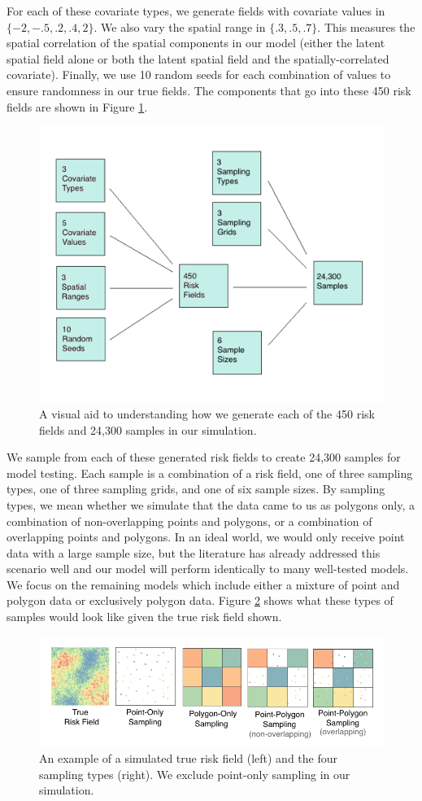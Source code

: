 \documentclass{article}
\begin{document}
For each of these covariate types, we generate fields with covariate values in $\{-2, -.5, .2, .4, 2\}$. We also vary the spatial range in $\{.3, .5, .7\}$. This measures the spatial correlation of the spatial components in our model (either the latent spatial field alone or both the latent spatial field and the spatially-correlated  covariate). Finally, we use 10 random seeds for each combination of values to ensure randomness in our true fields. The components that go into these 450 risk fields are shown in Figure \ref{fig:parPlot}.

 \begin{figure}[ht]
    \centering
    \includegraphics[width=.7\textwidth]{./figures/samplingexplained.png}
    \caption{A visual aid to understanding how we generate each of the 450 risk fields and 24,300 samples in our simulation.}
    \label{fig:parPlot}
\end{figure}

We sample from each of these generated risk fields to create 24,300 samples for model testing. Each sample is a combination of a risk field, one of three sampling types, one of three sampling grids, and one of six sample sizes. By sampling types, we mean whether we simulate that the data came to us as polygons only, a combination of non-overlapping points and polygons, or a combination of overlapping points and polygons. In an ideal world, we would only receive point data with a large sample size, but the literature has already addressed this scenario well and our model will perform identically to many well-tested models. We focus on the remaining models which include either a mixture of point and polygon data or exclusively polygon data. Figure \ref{fig:samplingPlot} shows what these types of samples would look like given the true risk field shown.

\begin{figure}[ht]
    \centering
    \includegraphics[width=.7\textwidth]{./figures/samplingtypes2.png}
    \caption{An example of a simulated true risk field (left) and the four sampling types (right). We exclude point-only sampling in our simulation.}
    \label{fig:samplingPlot}
\end{figure}
\end{document}
